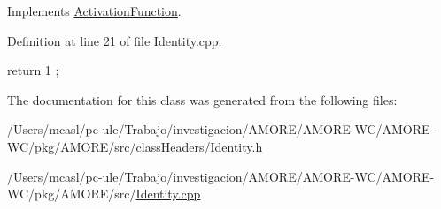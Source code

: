 Implements \hyperlink{class_activation_function_aa5a0a713bc1080ab5d5ae3632a08b08e}{ActivationFunction}.



Definition at line 21 of file Identity.cpp.


\begin{DoxyCode}
                     {
  return 1 ;
}
\end{DoxyCode}


The documentation for this class was generated from the following files:\begin{DoxyCompactItemize}
\item 
/Users/mcasl/pc-\/ule/Trabajo/investigacion/AMORE/AMORE-\/WC/AMORE-\/WC/pkg/AMORE/src/classHeaders/\hyperlink{_identity_8h}{Identity.h}\item 
/Users/mcasl/pc-\/ule/Trabajo/investigacion/AMORE/AMORE-\/WC/AMORE-\/WC/pkg/AMORE/src/\hyperlink{_identity_8cpp}{Identity.cpp}\end{DoxyCompactItemize}
